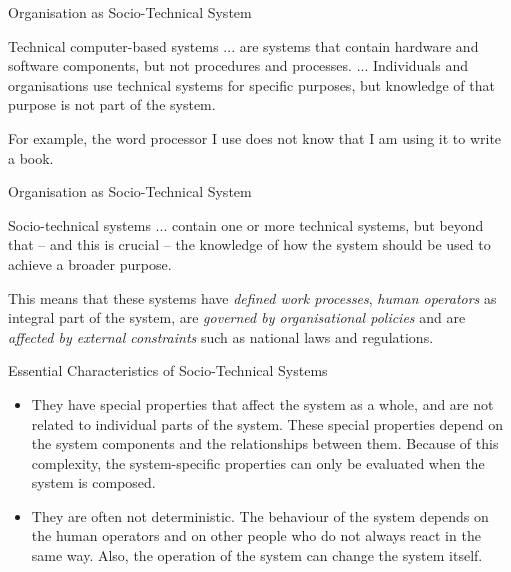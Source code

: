 \documentclass{beamer}
\begin{document}
\begin{frame}{Organisation as Socio-Technical System}
  \begin{block} {Technical computer-based systems}
    ... are systems that contain hardware and software components, but not
    procedures and processes. ... Individuals and organisations use technical
    systems for specific purposes, but knowledge of that purpose is not part
    of the system.\medskip

    For example, the word processor I use does not know that I am using it to
    write a book.
  \end{block}

\end{frame}

\begin{frame}{Organisation as Socio-Technical System}

  \begin{block}{Socio-technical systems}
    ... contain one or more technical systems, but beyond that -- and this is
    crucial -- the knowledge of how the system should be used to achieve a
    broader purpose.\medskip

    This means that these systems have \emph{defined work processes},
    \emph{human operators} as integral part of the system, are \emph{governed
      by organisational policies} and are \emph{affected by external
      constraints} such as national laws and regulations.
  \end{block}

\end{frame}

\begin{frame}{Essential Characteristics of Socio-Technical Systems}
\begin{itemize}
\item They have special properties that affect the system as a whole, and are
  not related to individual parts of the system. These special properties
  depend on the system components and the relationships between them. Because
  of this complexity, the system-specific properties can only be evaluated
  when the system is composed.\medskip
\item They are often not deterministic. The behaviour of the system depends on
  the human operators and on other people who do not always react in the same
  way. Also, the operation of the system can change the system itself.
\end{itemize}
\end{frame}
\end{document}
